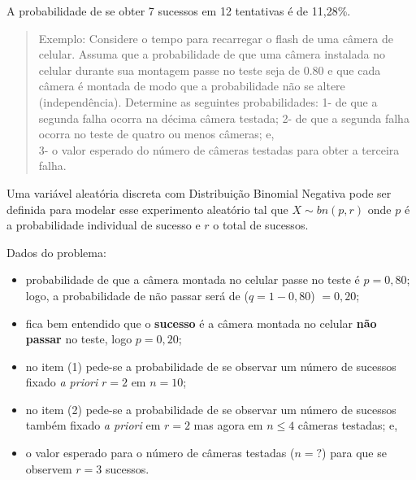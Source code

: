 \documentclass[
]{book}
\providecommand{\tightlist}{%
  \setlength{\itemsep}{0pt}\setlength{\parskip}{0pt}}
\begin{document}
A probabilidade de se obter 7 sucessos em 12 tentativas é de 11,28\%.

\hfill\break

\begin{quote}
Exemplo: Considere o tempo para recarregar o flash de uma câmera de celular. Assuma que a probabilidade de que uma câmera instalada no celular durante sua montagem passe no teste seja de 0.80 e que cada câmera é montada de modo que a probabilidade não se altere (independência). Determine as seguintes probabilidades:
1- de que a segunda falha ocorra na décima câmera testada;
2- de que a segunda falha ocorra no teste de quatro ou menos câmeras; e,\\
3- o valor esperado do número de câmeras testadas para obter a terceira falha.
\end{quote}

\hfill\break

Uma variável aleatória discreta com Distribuição Binomial Negativa pode ser definida para modelar esse experimento aleatório tal que \(X\sim bn(p,r)\) onde \(p\) é a probabilidade individual de sucesso e \(r\) o total de sucessos.

\hfill\break

Dados do problema:

\hfill\break

\begin{itemize}
\tightlist
\item
  probabilidade de que a câmera montada no celular passe no teste é \(p=0,80\); logo, a probabilidade de não passar será de (\(q=1-0,80\)) \(=0,20\);\\
\item
  fica bem entendido que o \textbf{sucesso} é a câmera montada no celular \textbf{não passar} no teste, logo \(p=0,20\);\\
\item
  no item (1) pede-se a probabilidade de se observar um número de sucessos fixado \emph{a priori} \(r=2\) em \(n=10\);\\
\item
  no item (2) pede-se a probabilidade de se observar um número de sucessos também fixado \emph{a priori} em \(r=2\) mas agora em \(n \le 4\) câmeras testadas; e,\\
\item
  o valor esperado para o número de câmeras testadas (\(n=?\)) para que se observem \(r=3\) sucessos.
\end{itemize}

\hfill\break
\end{document}
